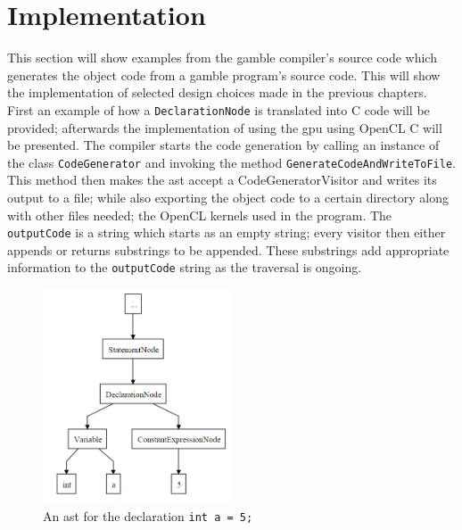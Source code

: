 \section{Implementation}
This section will show examples from the \gls{gamble} compiler's source code which generates the object code from a \gls{gamble} program's source code.
This will show the implementation of selected design choices made in the previous chapters.
First an example of how a \texttt{DeclarationNode} is translated into C code will be provided; afterwards the implementation of using the \acrshort{gpu} using OpenCL C will be presented.
The compiler starts the code generation by calling an instance of the class \texttt{CodeGenerator} and invoking the method \texttt{GenerateCodeAndWriteToFile}.
This method then makes the \acrshort{ast} accept a CodeGeneratorVisitor and writes its output to a file; while also exporting the object code to a certain directory along with other files needed; the OpenCL kernels used in the program.
The \texttt{outputCode} is a string which starts as an empty string; every visitor then either appends or returns substrings to be appended.
These substrings add appropriate information to the \texttt{outputCode} string as the traversal is ongoing.

\begin{figure}
\centering
\includegraphics[width=0.5\textwidth]{figures/Trees/ASTAlone.PNG}
\caption{An \acrshort{ast} for the declaration \texttt{int a = 5;}}\label{fig:ASTAlone}
\end{figure}

